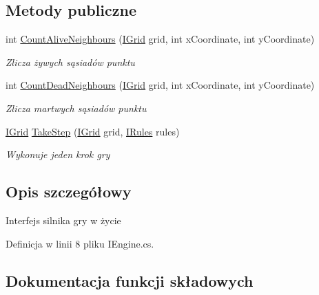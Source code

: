 \subsection*{Metody publiczne}
\begin{DoxyCompactItemize}
\item 
int \hyperlink{interface_convay_1_1_core_1_1_interfaces_1_1_i_engine_a0796a83275b1ec955e3f3f82d0a51a3d}{Count\+Alive\+Neighbours} (\hyperlink{interface_convay_1_1_core_1_1_interfaces_1_1_i_grid}{I\+Grid} grid, int x\+Coordinate, int y\+Coordinate)
\begin{DoxyCompactList}\small\item\em Zlicza żywych sąsiadów punktu \end{DoxyCompactList}\item 
int \hyperlink{interface_convay_1_1_core_1_1_interfaces_1_1_i_engine_a4c04381822239d478438ee7012acf9ca}{Count\+Dead\+Neighbours} (\hyperlink{interface_convay_1_1_core_1_1_interfaces_1_1_i_grid}{I\+Grid} grid, int x\+Coordinate, int y\+Coordinate)
\begin{DoxyCompactList}\small\item\em Zlicza martwych sąsiadów punktu \end{DoxyCompactList}\item 
\hyperlink{interface_convay_1_1_core_1_1_interfaces_1_1_i_grid}{I\+Grid} \hyperlink{interface_convay_1_1_core_1_1_interfaces_1_1_i_engine_a58f031ed5f145506e9dd1e6067c683a5}{Take\+Step} (\hyperlink{interface_convay_1_1_core_1_1_interfaces_1_1_i_grid}{I\+Grid} grid, \hyperlink{interface_convay_1_1_core_1_1_interfaces_1_1_i_rules}{I\+Rules} rules)
\begin{DoxyCompactList}\small\item\em Wykonuje jeden krok gry \end{DoxyCompactList}\end{DoxyCompactItemize}


\subsection{Opis szczegółowy}
Interfejs silnika gry w życie 



Definicja w linii 8 pliku I\+Engine.\+cs.



\subsection{Dokumentacja funkcji składowych}
\hypertarget{interface_convay_1_1_core_1_1_interfaces_1_1_i_engine_a0796a83275b1ec955e3f3f82d0a51a3d}{}\label{interface_convay_1_1_core_1_1_interfaces_1_1_i_engine_a0796a83275b1ec955e3f3f82d0a51a3d} 
